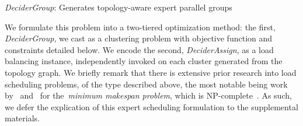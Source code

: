 \begin{algorithm}[!h]
    \DontPrintSemicolon
    \caption{\emph{DeciderGroup}: Generates topology-aware expert parallel groups}\label{alg:dg}
\end{algorithm}
We formulate this problem into a two-tiered optimization method: the first, \emph{DeciderGroup},
we cast as a clustering problem with objective function and constraints detailed
below.
We encode the second, \emph{DeciderAssign}, as a
load balancing instance, independently invoked on each cluster generated from the topology graph.
We briefly remark that there is extensive prior research into load scheduling problems, of the type described above,
the most notable being work by~\cite{makespan1, makespan2} and~\cite{approx} for the~\emph{minimum makespan problem},
which is NP-complete~\cite{approx2}.
As such, we defer the explication of this expert scheduling formulation to the supplemental materials.


